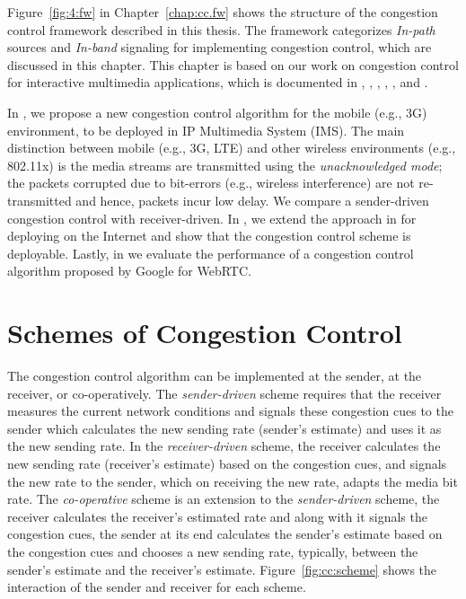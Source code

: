 Figure~\ref{fig:4:fw} in Chapter~\ref{chap:cc.fw} shows the structure of the
congestion control framework described in this thesis. The framework
categorizes \emph{In-path} sources and \emph{In-band} signaling for
implementing congestion control, which are discussed in this chapter. This
chapter is based on our work on congestion control for interactive multimedia
applications, which is documented in , ,
, \cite{draft.xr.discard.rle},
\cite{draft.xr.bytes.discarded}, \cite{singh:2010.thesis} and
\cite{Singh:control.loops.api}.

In , we propose a new congestion control algorithm for the
mobile (e.g., 3G) environment, to be deployed in IP Multimedia System (IMS).
The main distinction between mobile (e.g., 3G, LTE) and other wireless
environments (e.g., 802.11x) is the media streams are transmitted using the
\emph{unacknowledged mode}; the packets corrupted due to bit-errors (e.g.,
wireless interference) are not re-transmitted and hence, packets incur low
delay. We compare a sender-driven congestion control with receiver-driven. In
, we extend the approach in  for deploying on
the Internet and show that the congestion control scheme is deployable.
Lastly, in  we evaluate the performance of a congestion
control algorithm proposed by Google for WebRTC.

\section{Schemes of Congestion Control}

The congestion control algorithm can be implemented at the sender, at the
receiver, or co-operatively. The \emph{sender-driven} scheme requires that the
receiver measures the current network conditions and signals these congestion
cues to the sender which calculates the new sending rate (sender's estimate)
and uses it as the new sending rate. In the \emph{receiver-driven} scheme, the
receiver calculates the new sending rate (receiver's estimate) based on the
congestion cues, and signals the new rate to the sender, which on receiving
the new rate, adapts the media bit rate. The \emph{co-operative} scheme is an
extension to the \emph{sender-driven} scheme, the receiver calculates the
receiver's estimated rate and along with it signals the congestion cues, the
sender at its end calculates the sender's estimate based on the congestion
cues and chooses a new sending rate, typically, between the sender's estimate
and the receiver's estimate. Figure~\ref{fig:cc:scheme} shows the interaction
of the sender and receiver for each scheme.

